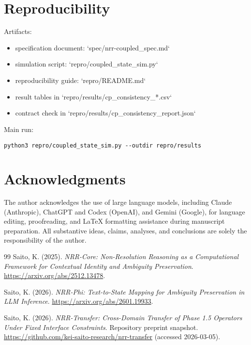 \documentclass[11pt,a4paper]{article}
\begin{document}
\section{Reproducibility}
Artifacts:
\begin{itemize}
  \item specification document: `spec/nrr-coupled\_spec.md`
  \item simulation script: `repro/coupled\_state\_sim.py`
  \item reproducibility guide: `repro/README.md`
  \item result tables in `repro/results/cp\_consistency\_*.csv`
  \item contract check in `repro/results/cp\_consistency\_report.json`
\end{itemize}

Main run:
\begin{lstlisting}
python3 repro/coupled_state_sim.py --outdir repro/results
\end{lstlisting}

\section*{Acknowledgments}

The author acknowledges the use of large language models, including
Claude (Anthropic), ChatGPT and Codex (OpenAI), and Gemini (Google), for
language editing, proofreading, and LaTeX formatting assistance during
manuscript preparation. All substantive ideas, claims, analyses, and
conclusions are solely the responsibility of the author.

\begin{thebibliography}{99}
Saito, K. (2025).
\textit{NRR-Core: Non-Resolution Reasoning as a Computational Framework for Contextual Identity and Ambiguity Preservation}.
\url{https://arxiv.org/abs/2512.13478}.

Saito, K. (2026).
\textit{NRR-Phi: Text-to-State Mapping for Ambiguity Preservation in LLM Inference}.
\url{https://arxiv.org/abs/2601.19933}.

Saito, K. (2026).
\textit{NRR-Transfer: Cross-Domain Transfer of Phase 1.5 Operators Under Fixed Interface Constraints}.
Repository preprint snapshot. \url{https://github.com/kei-saito-research/nrr-transfer} (accessed 2026-03-05).
\end{thebibliography}
\end{document}
